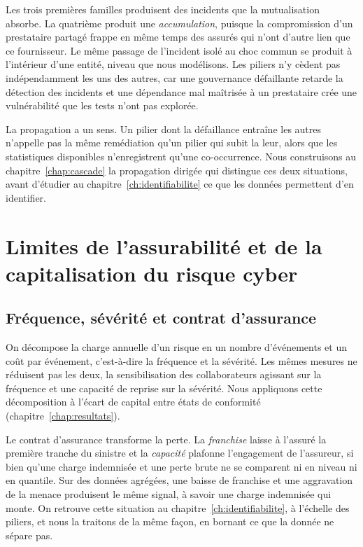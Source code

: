 Les trois premières familles produisent des incidents que la mutualisation absorbe. La quatrième
produit une \emph{accumulation}, puisque la compromission d'un prestataire partagé frappe en même temps
des assurés qui n'ont d'autre lien que ce fournisseur. Le même passage de l'incident isolé au choc
commun se produit à l'intérieur d'une entité, niveau que nous modélisons. Les piliers
n'y cèdent pas indépendamment les uns des autres, car une gouvernance défaillante retarde la
détection des incidents et une dépendance mal maîtrisée à un prestataire crée une vulnérabilité que
les tests n'ont pas explorée.

La propagation a un sens. Un pilier dont la défaillance entraîne les autres n'appelle pas la même
remédiation qu'un pilier qui subit la leur, alors que les statistiques disponibles n'enregistrent
qu'une co-occurrence. Nous construisons au chapitre~\ref{chap:cascade} la propagation dirigée qui distingue ces deux situations, avant d'étudier au chapitre~\ref{ch:identifiabilite} ce que les données
permettent d'en identifier.

\section{Limites de l'assurabilité et de la capitalisation du risque cyber}
\label{sec:assurabilite-capital}

\subsection{Fréquence, sévérité et contrat d'assurance}
\label{subsec:frequence-severite-contrat}

On décompose la charge annuelle d'un risque en un nombre d'événements et un coût par événement,
c'est-à-dire la fréquence et la sévérité. Les mêmes mesures ne réduisent pas les deux, la
sensibilisation des collaborateurs agissant sur la fréquence et une capacité de reprise sur la
sévérité. Nous appliquons cette décomposition à l'écart de capital entre états de conformité
(chapitre~\ref{chap:resultats}).

Le contrat d'assurance transforme la perte. La \emph{franchise} laisse à l'assuré la première
tranche du sinistre et la \emph{capacité} plafonne l'engagement de l'assureur, si bien qu'une
charge indemnisée et une perte brute ne se comparent ni en niveau ni en quantile. Sur des données
agrégées, une baisse de franchise et une aggravation de la menace produisent le même signal, à
savoir une charge indemnisée qui monte. On retrouve cette situation au
chapitre~\ref{ch:identifiabilite}, à l'échelle des piliers, et nous la traitons de la
même façon, en bornant ce que la donnée ne sépare pas.

